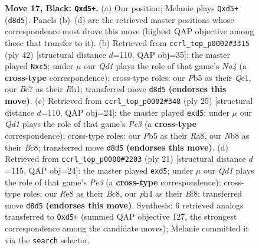 \documentclass[11pt]{article}
\begin{document}
\begin{figure}[p]
\caption{\textbf{Move 17, Black: \texttt{Qxd5+}.} (a) Our position; Melanie plays \texttt{Qxd5+} (\texttt{d8d5}). Panels (b)--(d) are the retrieved master positions whose correspondence most drove this move (highest QAP objective among those that transfer to it). (b) Retrieved from \texttt{ccrl\_top\_p0002\#3315} (ply 42) [structural distance $d$=110, QAP obj=35]: the master played \texttt{Nxc5}; under $\mu$ our \emph{Qd1} plays the role of that game's \emph{Na4} (a \textbf{cross-type} correspondence); cross-type roles: our \emph{P}b5 as their \emph{Q}e1, our \emph{B}e7 as their \emph{R}h1; transferred move \texttt{d8d5} \textbf{(endorses this move)}. (c) Retrieved from \texttt{ccrl\_top\_p0002\#348} (ply 25) [structural distance $d$=110, QAP obj=24]: the master played \texttt{exd5}; under $\mu$ our \emph{Qd1} plays the role of that game's \emph{Pe3} (a \textbf{cross-type} correspondence); cross-type roles: our \emph{P}b5 as their \emph{R}a8, our \emph{N}b8 as their \emph{B}c8; transferred move \texttt{d8d5} \textbf{(endorses this move)}. (d) Retrieved from \texttt{ccrl\_top\_p0000\#2203} (ply 21) [structural distance $d$=115, QAP obj=24]: the master played \texttt{exd5}; under $\mu$ our \emph{Qd1} plays the role of that game's \emph{Pe3} (a \textbf{cross-type} correspondence); cross-type roles: our \emph{R}e8 as their \emph{B}c8, our \emph{p}h4 as their \emph{B}f8; transferred move \texttt{d8d5} \textbf{(endorses this move)}. Synthesis: 6 retrieved analogs transferred to \texttt{Qxd5+} (summed QAP objective 127, the strongest correspondence among the candidate moves); Melanie committed it via the \texttt{search} selector.}
\label{fig:thought-m33}
\end{figure}

\clearpage
\end{document}
